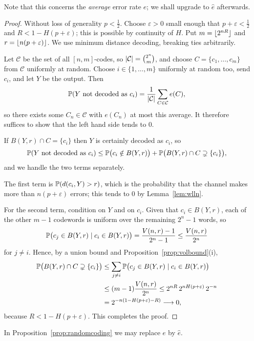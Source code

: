 \documentclass[a4paper]{scrartcl}
\DeclarePairedDelimiter{\floor}{\lfloor}{\rfloor}
\newcommand{\Cc}{\mathcal{C}}
\begin{document}
Note that this concerns the \emph{average} error rate $e$; we shall upgrade to $\hat e$ afterwards.

\begin{proof}
	Without loss of generality $p< \tfrac12$. Choose $\varepsilon>0$ small enough that $p+\varepsilon<\tfrac12$ and $R < 1-H(p+\varepsilon)$; this is possible by continuity of $H$. Put $m = \floor{2^{nR}}$ and $r = \floor{n(p+\varepsilon)}$. We use minimum distance decoding, breaking ties arbitrarily.

	Let $\Cc$ be the set of all $[n,m]$-codes, so $\abs{\Cc} = \binom{2^n}{m}$, and choose $C = \{c_1,\dots,c_m\}$ from $\Cc$ uniformly at random. Choose $i \in \{1,\dots,m\}$ uniformly at random too, send $c_i$, and let $Y$ be the output. Then
	$$\PP(Y \text{ not decoded as } c_i) = \frac{1}{\abs{\Cc}}\sum_{C \in \Cc} e(C),$$
	so there exists some $C_n \in \Cc$ with $e(C_n)$ at most this average. It therefore suffices to show that the left hand side tends to $0$.

	If $B(Y,r)\cap C = \{c_i\}$ then $Y$ is certainly decoded as $c_i$, so
	$$\mathbb{P}(Y\text{ not decoded as }c_i) \le \mathbb{P}\bigl(c_i \notin B(Y,r)\bigr) + \mathbb{P}\bigl(B(Y,r)\cap C \supsetneq \{c_i\}\bigr),$$
	and we handle the two terms separately.

	The first term is $\mathbb{P}(d(c_i,Y)>r)$, which is the probability that the channel makes more than $n(p+\varepsilon)$ errors; this tends to $0$ by Lemma~\ref{lem:wlln}.

	For the second term, condition on $Y$ and on $c_i$. Given that $c_i \in B(Y,r)$, each of the other $m-1$ codewords is uniform over the remaining $2^n - 1$ words, so
	$$\mathbb{P}\bigl(c_j \in B(Y,r)\mid c_i \in B(Y,r)\bigr) = \frac{V(n,r)-1}{2^n-1}\le \frac{V(n,r)}{2^n}$$
	for $j \ne i$. Hence, by a union bound and Proposition~\ref{prop:volbound}(i),
	\begin{align*}
		\mathbb{P}\bigl(B(Y,r)\cap C \supsetneq \{c_i\}\bigr) &\le \sum_{j\ne i}\mathbb{P}\bigl(c_j\in B(Y,r)\mid c_i \in B(Y,r)\bigr)\\
		&\le (m-1)\frac{V(n,r)}{2^n} \le 2^{nR}\,2^{nH(p+\varepsilon)}\,2^{-n}\\
		&= 2^{-n\left(1-H(p+\varepsilon)-R\right)} \longrightarrow 0,
	\end{align*}
	because $R < 1-H(p+\varepsilon)$. This completes the proof.
\end{proof}

\begin{proposition}
	In Proposition~\ref{prop:randomcoding} we may replace $e$ by $\hat e$.
\end{proposition}
\end{document}
